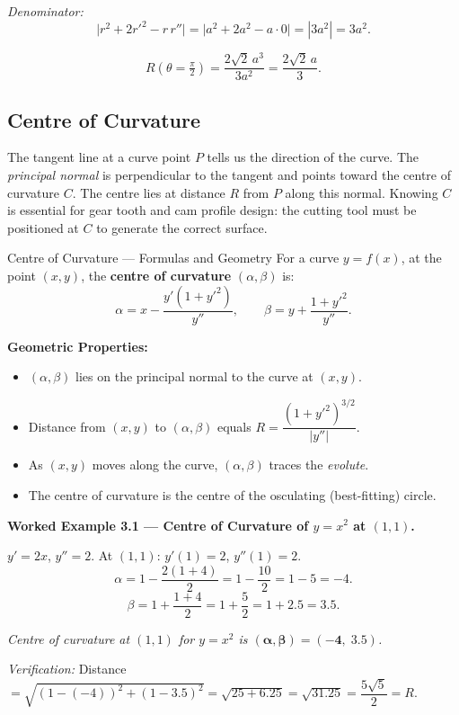 \documentclass[12pt,a4paper]{article}
\begin{document}
\textit{Denominator:}
\[
  \bigl|r^{2}+2r'^{2}-r\,r''\bigr| = \bigl|a^{2}+2a^{2}-a\cdot 0\bigr| = |3a^{2}| = 3a^{2}.
\]

\[
  \boxed{R\!\left(\theta=\tfrac{\pi}{2}\right) = \frac{2\sqrt{2}\,a^{3}}{3a^{2}} = \frac{2\sqrt{2}\,a}{3}.}
\]

\subsection{Centre of Curvature}

The tangent line at a curve point $P$ tells us the direction of the curve. The \emph{principal normal} is perpendicular to the tangent and points toward the centre of curvature $C$. The centre lies at distance $R$ from $P$ along this normal. Knowing $C$ is essential for gear tooth and cam profile design: the cutting tool must be positioned at $C$ to generate the correct surface.

\begin{infobox}{Centre of Curvature --- Formulas and Geometry}
For a curve $y = f(x)$, at the point $(x, y)$, the \textbf{centre of curvature} $(\alpha, \beta)$ is:
\[
  \alpha = x - \frac{y'(1+y'^{2})}{y''}, \qquad \beta = y + \frac{1+y'^{2}}{y''}.
\]

\textbf{Geometric Properties:}
\begin{itemize}[nosep]
  \item $(\alpha, \beta)$ lies on the principal normal to the curve at $(x, y)$.
  \item Distance from $(x, y)$ to $(\alpha, \beta)$ equals $R = \dfrac{(1+y'^{2})^{3/2}}{|y''|}$.
  \item As $(x, y)$ moves along the curve, $(\alpha, \beta)$ traces the \emph{evolute}.
  \item The centre of curvature is the centre of the osculating (best-fitting) circle.
\end{itemize}
\end{infobox}

\textbf{Worked Example 3.1 --- Centre of Curvature of $y = x^2$ at $(1,1)$.}

$y' = 2x$, $y'' = 2$. At $(1,1)$: $y'(1) = 2$, $y''(1) = 2$.
\[
  \alpha = 1 - \frac{2(1+4)}{2} = 1 - \frac{10}{2} = 1 - 5 = -4.
\]
\[
  \beta = 1 + \frac{1+4}{2} = 1 + \frac{5}{2} = 1 + 2.5 = 3.5.
\]

\textit{Centre of curvature at $(1,1)$ for $y=x^{2}$ is $\boldsymbol{(\alpha,\beta) = (-4,\; 3.5)}$.}

\textit{Verification:} Distance $= \sqrt{(1-(-4))^{2}+(1-3.5)^{2}} = \sqrt{25+6.25} = \sqrt{31.25} = \dfrac{5\sqrt{5}}{2} = R$. \checkmark
\end{document}
